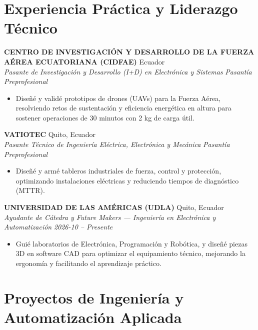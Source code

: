 \documentclass[10pt,a4paper]{article}
\begin{document}
\section{Experiencia Práctica y Liderazgo Técnico}

\textbf{CENTRO DE INVESTIGACIÓN Y DESARROLLO DE LA FUERZA AÉREA ECUATORIANA (CIDFAE)} \hfill Ecuador \\
\textit{Pasante de Investigación y Desarrollo (I+D) en Electrónica y Sistemas} \hfill \textit{Pasantía Preprofesional}
\begin{itemize}
    \item Diseñé y validé prototipos de drones (UAVs) para la Fuerza Aérea, resolviendo retos de sustentación y eficiencia energética en altura para sostener operaciones de 30 minutos con 2 kg de carga útil.
\end{itemize}
\vspace{3pt}

\textbf{VATIOTEC} \hfill Quito, Ecuador \\
\textit{Pasante Técnico de Ingeniería Eléctrica, Electrónica y Mecánica} \hfill \textit{Pasantía Preprofesional}
\begin{itemize}
    \item Diseñé y armé tableros industriales de fuerza, control y protección, optimizando instalaciones eléctricas y reduciendo tiempos de diagnóstico (MTTR).
\end{itemize}
\vspace{3pt}

\textbf{UNIVERSIDAD DE LAS AMÉRICAS (UDLA)} \hfill Quito, Ecuador \\
\textit{Ayudante de Cátedra y Future Makers — Ingeniería en Electrónica y Automatización} \hfill \textit{2026-10 -- Presente}
\begin{itemize}
    \item Guié laboratorios de Electrónica, Programación y Robótica, y diseñé piezas 3D en software CAD para optimizar el equipamiento técnico, mejorando la ergonomía y facilitando el aprendizaje práctico.
\end{itemize}

\section{Proyectos de Ingeniería y Automatización Aplicada}
\end{document}
